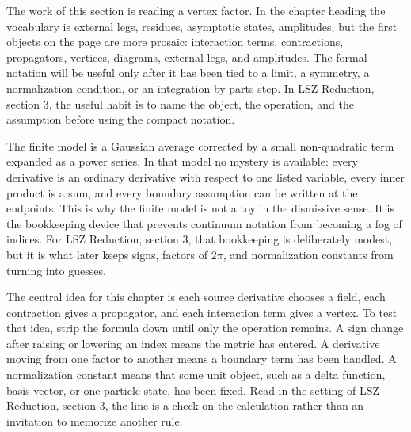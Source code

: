 











The work of this section is reading a vertex factor.  In the chapter heading the vocabulary is external legs, residues, asymptotic states, amplitudes, but the first objects on the page are more prosaic: interaction terms, contractions, propagators, vertices, diagrams, external legs, and amplitudes.  The formal notation will be useful only after it has been tied to a limit, a symmetry, a normalization condition, or an integration-by-parts step.  In LSZ Reduction, section 3, the useful habit is to name the object, the operation, and the assumption before using the compact notation.

The finite model is a Gaussian average corrected by a small non-quadratic term expanded as a power series.  In that model no mystery is available: every derivative is an ordinary derivative with respect to one listed variable, every inner product is a sum, and every boundary assumption can be written at the endpoints.  This is why the finite model is not a toy in the dismissive sense.  It is the bookkeeping device that prevents continuum notation from becoming a fog of indices.  For LSZ Reduction, section 3, that bookkeeping is deliberately modest, but it is what later keeps signs, factors of \(2\pi\), and normalization constants from turning into guesses.

The central idea for this chapter is each source derivative chooses a field, each contraction gives a propagator, and each interaction term gives a vertex.  To test that idea, strip the formula down until only the operation remains.  A sign change after raising or lowering an index means the metric has entered.  A derivative moving from one factor to another means a boundary term has been handled.  A normalization constant means that some unit object, such as a delta function, basis vector, or one-particle state, has been fixed.  Read in the setting of LSZ Reduction, section 3, the line is a check on the calculation rather than an invitation to memorize another rule.

